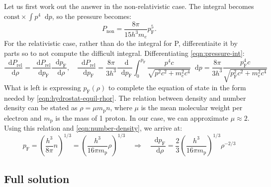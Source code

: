 \documentclass[]{article}
\newcommand{\dd}{\mathop{}\!\mathrm{d}}
\begin{document}
Let us first work out the answer in the non-relativistic case. The integral becomes $\text{const} \times \int p^4 \dd p$, so the pressure becomes:
\begin{equation}
	P_\mathrm{non} = \frac{8 \pi}{15 h^3 m_e} p_\mathrm{F}^5.
\end{equation}
For the relativistic case, rather than do the integral for P, differentiaite it by parts so to not compute the difficult integral. Differentiating \eqref{eqn:pressure-int}:
\begin{equation}
	\frac{\dd P_\mathrm{rel}}{\dd \rho} = \frac{\dd P_\mathrm{rel}}{\dd p_\mathrm{F}} \frac{\dd p_\mathrm{F}}{\dd \rho}, \quad \frac{\dd P_\mathrm{rel}}{\dd p_\mathrm{F}} = \frac{8\pi}{3h^3}\frac{\dd}{\dd p_\mathrm{F}}\int_0^{p_\mathrm{F}} \frac{p^4 c}{\sqrt{p^2c^2 + m_e^2 c^4}} \dd p = \frac{8\pi}{3h^3} \frac{p_\mathrm{F}^4 c}{\sqrt{p_\mathrm{F}^2c^2 + m_e^2 c^4}}
\end{equation}
What is left is expressing $p_\mathrm{F} (\rho)$ to complete the equation of state in the form needed by \eqref{eqn:hydrostat-equil-rhor}. The relation between density and number density can be stated as $\rho = \mu m_\mathrm{p} n$, where $\mu$ is the mean molecular weight per electron and $m_\mathrm{p}$ is the mass of 1 proton. In our case, we can approximate $\mu \approx 2$. Using this relation and \eqref{eqn:number-density}, we arrive at:
\begin{equation}
	p_\mathrm{F} = \left( \frac{h^3}{8 \pi} n \right)^{1/3} = \left( \frac{h^3}{16 \pi m_\mathrm{p}} \rho\right)^{1/3} \quad \Rightarrow \quad \frac{\dd p_\mathrm{F}}{\dd \rho} = \frac{2}{3} \left( \frac{h^3}{16 \pi m_\mathrm{p}}\right)^{1/3} \rho^{-2/3}
\end{equation}

\subsection{Full solution}
\end{document}
